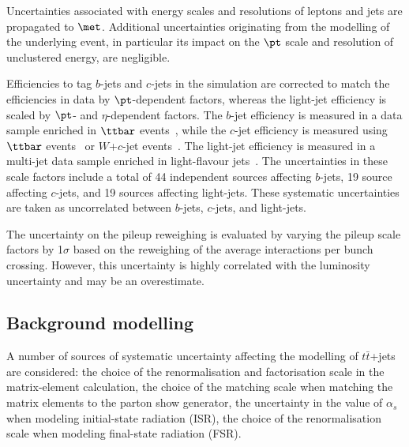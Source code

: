 Uncertainties associated with energy scales and resolutions of leptons and jets 
are propagated to $\met$. Additional uncertainties originating from the modelling 
of the underlying event, in particular its impact on the $\pt$ scale and resolution 
of unclustered energy, are negligible.

Efficiencies to tag $b$-jets and $c$-jets in the simulation are corrected to match the efficiencies in data by $\pt$-dependent factors,
whereas the light-jet efficiency is scaled by $\pt$- and $\eta$-dependent factors.
The $b$-jet efficiency is measured in a data sample enriched in $\ttbar$ events~\cite{Aad:2019epj79}, %
  while the $c$-jet efficiency is measured
using $\ttbar$ events~\cite{ATLAS-CONF-2018-001} or $W$+$c$-jet events~\cite{Aad:2015ydr}. 
The light-jet efficiency is measured in a multi-jet data sample enriched in light-flavour jets~\cite{ATLAS-CONF-2018-006}.
The uncertainties in these scale factors include a total of 44 independent sources affecting $b$-jets, 19 source affecting $c$-jets, and 19 sources affecting light-jets. 
These systematic uncertainties are taken as uncorrelated between $b$-jets, $c$-jets, and light-jets.

The uncertainty on the pileup reweighing is evaluated by varying the pileup scale factors
by 1$\sigma$ based on the reweighing of the average interactions per bunch crossing. However, this
uncertainty is highly correlated with the luminosity uncertainty and may be an overestimate.

\subsection{Background modelling}
\label{sec:syst_bkgmodeling}

A number of sources of systematic uncertainty affecting the modelling of $t\bar{t}$+jets are considered: the choice of the renormalisation and factorisation scale in the matrix-element calculation, the choice of the matching scale when matching the matrix elements to the parton show generator, the uncertainty in the value of $\alpha_s$ when modeling initial-state radiation (ISR), the choice of the renormalisation scale when modeling final-state radiation (FSR).

